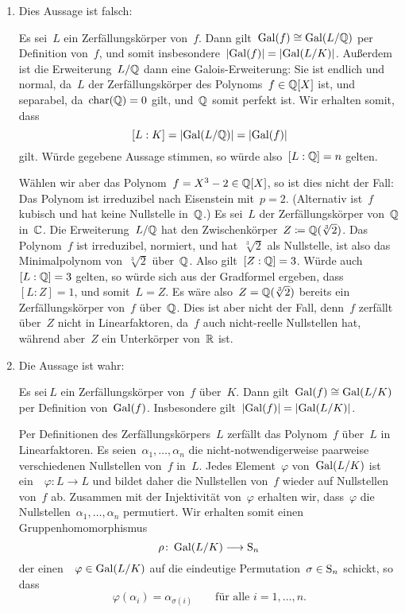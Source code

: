 \documentclass{scrartcl}
\begin{document}
\begin{solution}
  \begin{enumerate}
    \item
      Dies Aussage ist falsch:

      Es sei~$L$ ein Zerfällungskörper von~$f$.
      Dann gilt~$\operatorname{Gal}(f) \cong \operatorname{Gal}(L/\mathbb{Q})$ per Definition von~$f$, und somit insbesondere~$\lvert \operatorname{Gal}(f) \rvert = \lvert \operatorname{Gal}(L/K) \rvert$.
      Außerdem ist die Erweiterung~$L/\mathbb{Q}$ dann eine Galois-Erweiterung:
      Sie ist endlich und normal, da~$L$ der Zerfällungskörper des Polynoms~$f \in \mathbb{Q}[X]$ ist, und separabel, da~$\operatorname{char}(\mathbb{Q}) = 0$ gilt, und~$\mathbb{Q}$ somit perfekt ist.
      Wir erhalten somit, dass
      \[
        [L : K]
        =
        \lvert \operatorname{Gal}(L/\mathbb{Q}) \rvert
        =
        \lvert \operatorname{Gal}(f) \rvert
      \]
      gilt.
      Würde gegebene Aussage stimmen, so würde also~$[L : \mathbb{Q}] = n$ gelten.

      Wählen wir aber das Polynom~$f = X^3 - 2 \in \mathbb{Q}[X]$, so ist dies nicht der Fall:
      Das Polynom ist irreduzibel nach Eisenstein mit~$p = 2$.
      (Alternativ ist~$f$ kubisch und hat keine Nullstelle in~$\mathbb{Q}$.)
      Es sei~$L$ der Zerfällungskörper von~$\mathbb{Q}$ in~$\mathbb{C}$.
      Die Erweiterung~$L/\mathbb{Q}$ hat den Zwischenkörper~$Z \coloneqq \mathbb{Q}(\sqrt[3]{2})$.
      Das Polynom~$f$ ist irreduzibel, normiert, und hat~$\sqrt[3]{2}$ als Nullstelle, ist also das Minimalpolynom von~$\sqrt[3]{2}$ über~$\mathbb{Q}$.
      Also gilt~$[Z : \mathbb{Q}] = 3$.
      Würde auch~$[L : \mathbb{Q}] = 3$ gelten, so würde sich aus der Gradformel ergeben, dass~$[L : Z] = 1$, und somit~$L = Z$.
      Es wäre also~$Z = \mathbb{Q}(\sqrt[3]{2})$ bereits ein Zerfällungskörper von~$f$ über~$\mathbb{Q}$.
      Dies ist aber nicht der Fall, denn~$f$ zerfällt über~$Z$ nicht in Linearfaktoren, da~$f$ auch nicht-reelle Nullstellen hat, während aber~$Z$ ein Unterkörper von~$\mathbb{R}$ ist.

    \item
      Die Aussage ist wahr:

      Es sei$~L$ ein Zerfällungskörper von~$f$ über~$K$.
      Dann gilt~$\operatorname{Gal}(f) \cong \operatorname{Gal}(L/K)$ per Definition von~$\operatorname{Gal}(f)$.
      Insbesondere gilt~$\lvert \operatorname{Gal}(f) \rvert = \lvert \operatorname{Gal}(L/K) \rvert$.

      Per Definitionen des Zerfällungskörpers~$L$ zerfällt das Polynom~$f$ über~$L$ in Linearfaktoren.
      Es seien~$\alpha_1, \dotsc, \alpha_n$ die nicht-notwendigerweise paarweise verschiedenen Nullstellen von~$f$ in~$L$.
      Jedes Element~$\varphi$ von~$\operatorname{Gal}(L/K)$ ist ein~~$\varphi \colon L \to L$ und bildet daher die Nullstellen von~$f$ wieder auf Nullstellen von~$f$ ab.
      Zusammen mit der Injektivität von~$\varphi$ erhalten wir, dass~$\varphi$ die Nullstellen~$\alpha_1, \dotsc, \alpha_n$ permutiert.
      Wir erhalten somit einen Gruppenhomomorphismus
      \[
        \rho
        \colon
        \Gal(L/K)
        \to
        \Sym_n
      \]
      der einen~~$\varphi \in \operatorname{Gal}(L/K)$ auf die eindeutige Permutation~$\sigma \in \operatorname{S}_n$ schickt, so dass
      \[
        \varphi( \alpha_i ) = \alpha_{\sigma(i)}
        \qquad
        \text{für alle~$i = 1, \dotsc, n$.}
      \]


\end{enumerate}
\end{solution}
\end{document}
